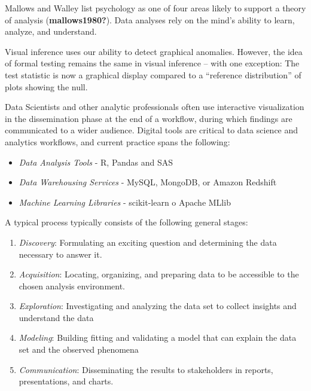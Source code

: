 \documentclass[print]{nuthesis}
\providecommand{\tightlist}{%
  \setlength{\itemsep}{0pt}\setlength{\parskip}{0pt}}
\begin{document}

Mallows and Walley list psychology as one of four areas likely to support a theory of analysis (\textbf{mallows1980?}).
Data analyses rely on the mind's ability to learn, analyze, and understand.

Visual inference uses our ability to detect graphical anomalies.
However, the idea of formal testing remains the same in visual inference -- with one exception: The test statistic is now a graphical display compared to a ``reference distribution'' of plots showing the null.

Data Scientists and other analytic professionals often use interactive visualization in the dissemination phase at the end of a workflow, during which findings are communicated to a wider audience.
Digital tools are critical to data science and analytics workflows, and current practice spans the following:

\begin{itemize}
\tightlist
\item
  \emph{Data Analysis Tools} - R, Pandas and SAS
\item
  \emph{Data Warehousing Services} - MySQL, MongoDB, or Amazon Redshift
\item
  \emph{Machine Learning Libraries} - scikit-learn o Apache MLlib
\end{itemize}

A typical process typically consists of the following general stages:

\begin{enumerate}
\def\labelenumi{\arabic{enumi}.}
\tightlist
\item
  \emph{Discovery}: Formulating an exciting question and determining the data necessary to answer it.
\item
  \emph{Acquisition}: Locating, organizing, and preparing data to be accessible to the chosen analysis environment.
\item
  \emph{Exploration}: Investigating and analyzing the data set to collect insights and understand the data
\item
  \emph{Modeling}: Building fitting and validating a model that can explain the data set and the observed phenomena
\item
  \emph{Communication}: Disseminating the results to stakeholders in reports, presentations, and charts.
\end{enumerate}
\end{document}
